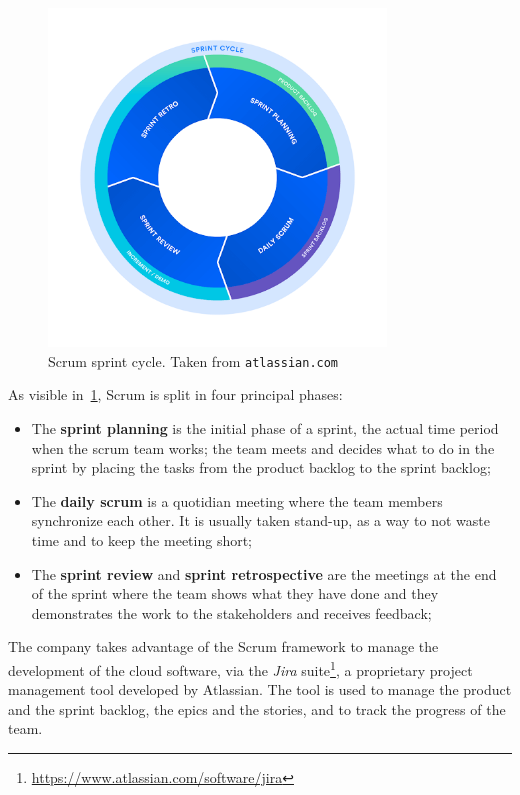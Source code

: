 \begin{figure}[t]
  \centering
  \includegraphics[width=0.8\textwidth]{chapters/04/assets/scrum}
  \caption{Scrum sprint cycle. Taken from \texttt{atlassian.com}}
  \label{fig:scrum-sprint-cycle}
\end{figure}

As visible in~\cref{fig:scrum-sprint-cycle}, Scrum is split in four principal phases:
\begin{itemize}
  \item The \textbf{sprint planning} is the initial phase of a sprint, the actual time period when the scrum team works; the team meets and decides what to do in the sprint by placing the tasks from the product backlog to the sprint backlog;
  \item The \textbf{daily scrum} is a quotidian meeting where the team members synchronize each other. It is usually taken stand-up, as a way to not waste time and to keep the meeting short;
  \item The \textbf{sprint review} and \textbf{sprint retrospective} are the meetings at the end of the sprint where the team shows what they have done and they demonstrates the work to the stakeholders and receives feedback;
\end{itemize}

The company takes advantage of the Scrum framework to manage the development of the cloud software, via the \textit{Jira} suite\footnote{\url{https://www.atlassian.com/software/jira}}, a proprietary project management tool developed by Atlassian. The tool is used to manage the product and the sprint backlog, the epics and the stories, and to track the progress of the team.

